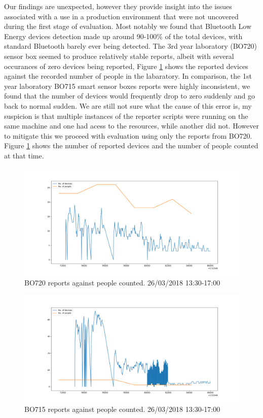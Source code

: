 \documentclass{l4proj}
\begin{document}
Our findings are unexpected, however they provide insight into the issues associated with a use in a production environment that were not uncovered during the first stage of evaluation. Most notably we found that Bluetooth Low Energy devices detection made up around 90-100\% of the total devices, with standard Bluetooth barely ever being detected. The 3rd year laboratory (BO720) sensor box seemed to produce relatively stable reports, albeit with several occurances of zero devices being reported, Figure \ref{fig:bo720devices} shows the reported devices against the recorded number of people in the labaratory. In comparison, the 1st year laboratory BO715 smart sensor boxes reports were highly inconsistent, we found that the number of devices would frequently drop to zero suddenly and go back to normal sudden. We are still not sure what the cause of this error is, my suspicion is that multiple instances of the reporter scripts were running on the same machine and one had acess to the resources, while another did not. However to mitigate this we proceed with evaluation using only the reports from BO720. Figure \ref{fig:bo720devices} shows the number of reported devices and the number of people counted at that time.

\begin{figure}
\centering
\includegraphics[width=\textwidth]{bo720devices}
\caption{BO720 reports against people counted. 26/03/2018  13:30-17:00}
\label{fig:bo720devices}
\end{figure}


\begin{figure}
\centering
\includegraphics[width=\linewidth]{bo715devices}
\caption{BO715 reports against people counted. 26/03/2018  13:30-17:00}
\label{fig:bo715devices}
\end{figure}
\end{document}
